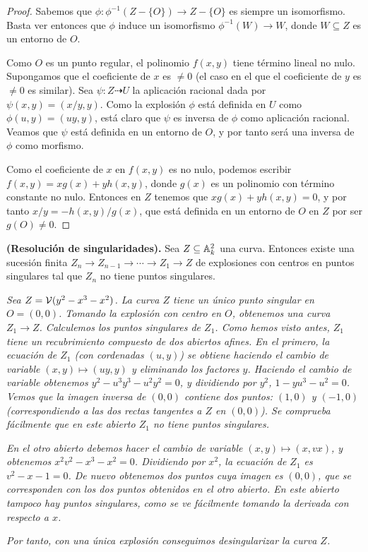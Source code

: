 \documentclass[ACGA.tex]{subfiles}
\begin{document}
\begin{proof}
 Sabemos que $\phi:\phi^{-1}(Z-\{O\})\to Z-\{O\}$ es siempre un isomorfismo. Basta ver entonces que $\phi$ induce un isomorfismo $\phi^{-1}(W)\to W$, donde $W\subseteq Z$ es un entorno de $O$. 

Como $O$ es un punto regular, el polinomio $f(x,y)$ tiene término lineal no nulo. Supongamos que el coeficiente de $x$ es $\neq 0$ (el caso en el que el coeficiente de $y$ es $\neq 0$ es similar). Sea $\psi:Z\dashrightarrow U$ la aplicación racional dada por $\psi(x,y)=(x/y,y)$. Como la explosión $\phi$ está definida en $U$ como $\phi(u,y)=(uy,y)$, está claro que $\psi$ es inversa de $\phi$ como aplicación racional. Veamos que $\psi$ está definida en un entorno de $O$, y por tanto será una inversa de $\phi$ como morfismo.

Como el coeficiente de $x$ en $f(x,y)$ es no nulo, podemos escribir $f(x,y)=xg(x)+yh(x,y)$, donde $g(x)$ es un polinomio con término constante no nulo. Entonces en $Z$ tenemos que $xg(x)+yh(x,y)=0$, y por tanto $x/y=-h(x,y)/g(x)$, que está definida en un entorno de $O$ en $Z$ por ser $g(O)\neq 0$.
\end{proof}  

\begin{teorema} {\bf (Resolución de singularidades).} Sea $Z\subseteq\mathbb{A}^2_k$ una curva. Entonces existe una sucesión finita $Z_n\to Z_{n-1}\to \cdots\to Z_1\to Z$ de explosiones con centros en puntos singulares tal que $Z_n$ no tiene puntos singulares. 
 \end{teorema}

\begin{ejs}
\emph{ Sea $Z=\mathcal{V}(y^2-x^3-x^2)$. La curva $Z$ tiene un único punto singular en $O=(0,0)$. Tomando la explosión con centro en $O$, obtenemos una curva $Z_1\to Z$. Calculemos los puntos singulares de $Z_1$. Como hemos visto antes, $Z_1$ tiene un recubrimiento compuesto de dos abiertos afines. En el primero, la ecuación de $Z_1$ (con cordenadas $(u,y)$) se obtiene haciendo el cambio de variable $(x,y)\mapsto (uy,y)$ y eliminando los factores $y$. Haciendo el cambio de variable obtenemos $y^2-u^3y^3-u^2y^2=0$, y dividiendo por $y^2$, $1-yu^3-u^2=0$. Vemos que la imagen inversa de $(0,0)$ contiene dos puntos: $(1,0)$ y $(-1,0)$ (correspondiendo a las dos rectas tangentes a $Z$ en $(0,0)$). Se comprueba fácilmente que en este abierto $Z_1$ no tiene puntos singulares.}

\emph{En el otro abierto debemos hacer el cambio de variable $(x,y)\mapsto (x,vx)$, y obtenemos $x^2v^2-x^3-x^2=0$. Dividiendo por $x^2$, la ecuación de $Z_1$ es $v^2-x-1=0$. De nuevo obtenemos dos puntos cuya imagen es $(0,0)$, que se corresponden con los dos puntos obtenidos en el otro abierto. En este abierto tampoco hay puntos singulares, como se ve fácilmente tomando la derivada con respecto a $x$.}

\emph{Por tanto, con una única explosión conseguimos desingularizar la curva $Z$.}
\end{ejs}
\end{document}
